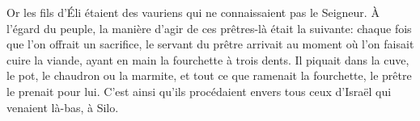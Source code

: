 Or les fils d’Éli étaient des vauriens qui ne connaissaient pas le Seigneur.
À l’égard du peuple, la manière d’agir de ces prêtres-là était la suivante:
	chaque fois que l’on offrait un sacrifice,
	le servant du prêtre arrivait au moment où l’on faisait cuire la viande,
	ayant en main la fourchette à trois dents.
Il piquait dans la cuve, le pot, le chaudron ou la marmite,
	et tout ce que ramenait la fourchette, le prêtre le prenait pour lui.
C’est ainsi qu’ils procédaient envers tous ceux d’Israël qui venaient là-bas, à Silo.
